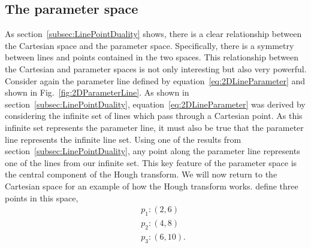 \subsection{The parameter space}
\label{subsec:ParameterSpace}
As section~\ref{subsec:LinePointDuality} shows, there is a clear relationship between the Cartesian space and the parameter space.  Specifically, there is a symmetry between lines and points contained in the two spaces.  This relationship between the Cartesian and parameter spaces is not only interesting but also very powerful.  Consider again the parameter line defined by equation~\ref{eq:2DLineParameter} and shown in Fig.~\ref{fig:2DParameterLine}.  As shown in section~\ref{subsec:LinePointDuality}, equation~\ref{eq:2DLineParameter} was derived by considering the infinite set of lines which pass through a Cartesian point.  As this infinite set represents the parameter line, it must also be true that the parameter line represents the infinite line set.  Using one of the results from section~\ref{subsec:LinePointDuality}, any point along the parameter line represents one of the lines from our infinite set.  This key feature of the parameter space is the central component of the Hough transform.  
\newline
\newline
We will now return to the Cartesian space for an example of how the Hough transform works.   define three points in this space,
\begin{equation}
  \begin{split}
    &\quad p_{1}: (2,6) \\
    &\quad p_{2}: (4,8) \\
    &\quad p_{3}: (6,10).
  \end{split}
  \label{eq:HTExampleCartesianPoints}
\end{equation}
